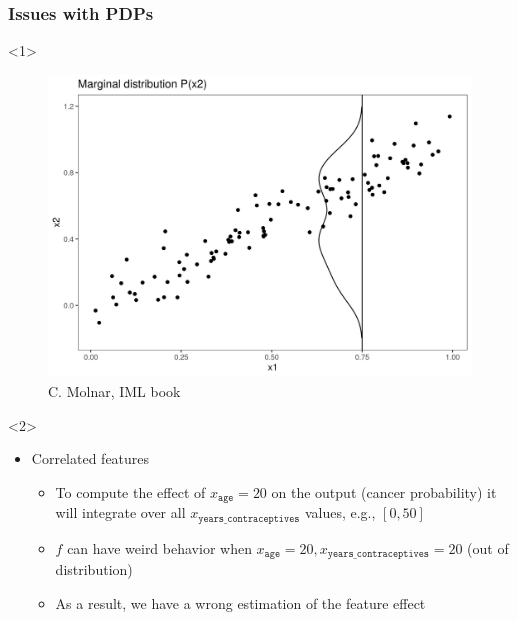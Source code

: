 \documentclass{beamer}
\begin{document}
\begin{frame}
  \frametitle{Issues with PDPs}
  \begin{onlyenv}<1>
    \begin{figure}
      \includegraphics[width=.6\textwidth]{./figures/aleplot-motivation1-1}
      \caption{\footnotesize C. Molnar, IML book}
    \end{figure}
  \end{onlyenv}
  \begin{onlyenv}<2>
    \begin{itemize}
    \item Correlated features
      \begin{itemize}
      \item To compute the effect of \(x_{\mathtt{age}} = 20\) on the
        output (cancer probability) it will integrate over all
        \(x_{\mathtt{years\_contraceptives}}\) values, e.g., \([0, 50]\)
      \item \(f\) can have weird behavior when
        \(x_{\mathtt{age}} = 20, x_{\mathtt{years\_contraceptives}}=
        20\) (out of distribution)
      \item As a result, we have a wrong estimation of the feature effect
      \end{itemize}
      \end{itemize}
  \end{onlyenv}
\end{frame}
\end{document}
